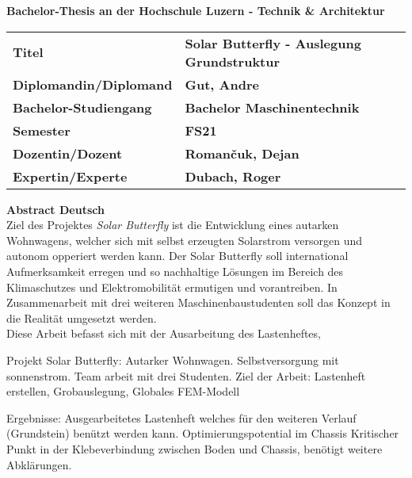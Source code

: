 \vspace{2cm}
\begin{large}
\textbf{Bachelor-Thesis an der Hochschule Luzern - Technik \& Architektur}\\
\end{large}
\vspace{1cm}

\begin{table}[H]
\small
  \begin{tabularx}{\linewidth}{llX}
    \textbf{Titel}                 & \textbf{Solar Butterfly - Auslegung Grundstruktur} &\\[4 mm]
    \textbf{Diplomandin/Diplomand} & \textbf{Gut, Andre}                                &\\[4 mm]
    \textbf{Bachelor-Studiengang}  & \textbf{Bachelor Maschinentechnik}                 &\\[4 mm]
    \textbf{Semester}              & \textbf{FS21}                                      &\\[4 mm]
    \textbf{Dozentin/Dozent}       & \textbf{Roman\v{c}uk, Dejan}                       &\\[4 mm]
    \textbf{Expertin/Experte}      & \textbf{Dubach, Roger}                             &
  \end{tabularx}
\end{table}

\vspace{1.5cm}
\textbf{Abstract Deutsch}\\
Ziel des Projektes \emph{Solar Butterfly} ist die Entwicklung eines autarken Wohnwagens, welcher sich mit selbst erzeugten Solarstrom versorgen und autonom opperiert werden kann. Der Solar Butterfly soll international Aufmerksamkeit erregen und so nachhaltige Lösungen im Bereich des Klimaschutzes und Elektromobilität ermutigen und vorantreiben. In Zusammenarbeit mit drei weiteren Maschinenbaustudenten soll das Konzept in die Realität umgesetzt werden.\\
Diese Arbeit befasst sich mit der Ausarbeitung des Lastenheftes,   


Projekt Solar Butterfly: Autarker Wohnwagen. Selbstversorgung mit sonnenstrom.
Team arbeit mit drei Studenten.
Ziel der Arbeit: Lastenheft erstellen, Grobauslegung, Globales FEM-Modell

Ergebnisse:
Ausgearbeitetes Lastenheft welches für den weiteren Verlauf (Grundstein) benützt werden kann.
Optimierungspotential im Chassis
Kritischer Punkt in der Klebeverbindung zwischen Boden und Chassis, benötigt weitere Abklärungen.


